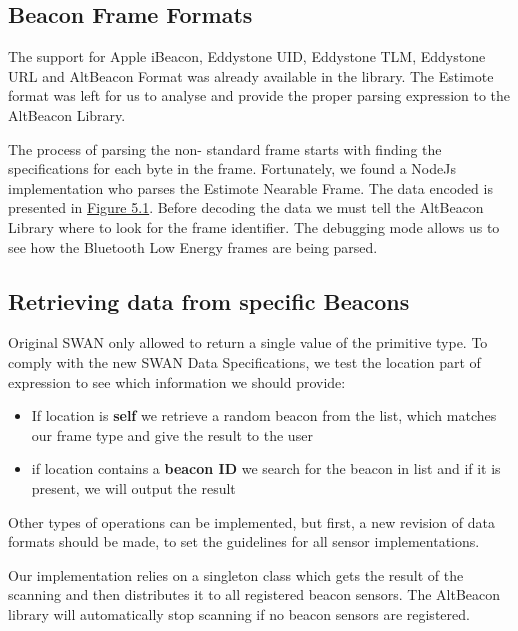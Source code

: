\subsection{Beacon Frame Formats}
The support for Apple iBeacon, Eddystone UID, Eddystone TLM, Eddystone URL and AltBeacon Format was already available in the library.
The Estimote format was left for us to analyse and provide the proper parsing expression to the AltBeacon Library.

The process of parsing the non- standard frame starts with finding the specifications for each byte in the frame. Fortunately, we found a NodeJs implementation 
who parses the Estimote Nearable Frame. The data encoded is presented in \hyperref[fig:estimote_format]{Figure 5.1}.
Before decoding the data we must tell the AltBeacon Library where to look for the frame identifier. The debugging mode allows us to see how the Bluetooth Low Energy frames are being parsed.

\subsection{Retrieving data from specific Beacons}
Original SWAN only allowed to return a single value of the primitive type. To comply with the new SWAN Data Specifications, we test the location part of expression to see which information we should provide:

\begin{itemize}
 \item If location is \textbf{self} we retrieve a random beacon from the list, which matches our frame type and give the result to the user
 \item if location contains a \textbf{beacon ID} we search for the beacon in list and if it is present, we will output the result
\end{itemize}

Other types of operations can be implemented, but first, a new revision of data formats should be made, to set the guidelines for all sensor implementations.

Our implementation relies on a singleton class which gets the result of the scanning and then distributes it to all registered beacon sensors. The AltBeacon library will automatically stop scanning
if no beacon sensors are registered.

